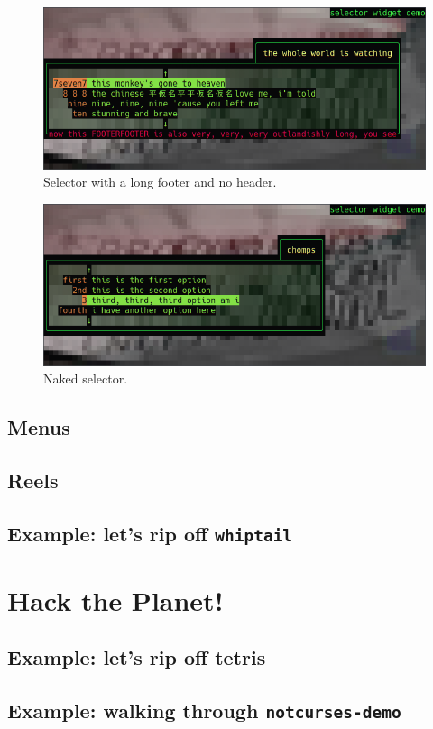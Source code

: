 \documentclass[letterpaper,10pt]{article}
\begin{document}
\begin{figure}
\centering \includegraphics[width=.75\linewidth]{media/selector4.png}
\caption{Selector with a long footer and no header.}
\end{figure}

\begin{figure}
  \centering \includegraphics[width=.75\linewidth]{media/selector5.png}
  \caption{Naked selector.}
\end{figure}

\subsection{Menus}
\subsection{Reels}
\subsection{Example: let's rip off \texttt{whiptail}}

\section{Hack the Planet!}
\subsection{Example: let's rip off tetris}
\label{section:casestudy}
\subsection{Example: walking through \texttt{notcurses-demo}}
\end{document}

